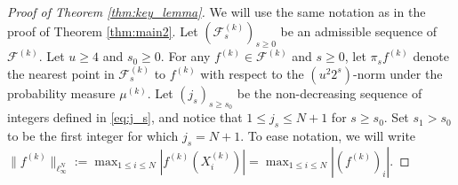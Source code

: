 \documentclass[numbers,webpdf,imaiai]{ima-authoring-template}
\theoremstyle{thmstyletwo}%
\numberwithin{equation}{section}
\numberwithin{equation}{section}
\providecommand{\mathbbm}{\mathbb} %
\newcommand{\R}{\mathbbm{R}}
\newcommand{\F}{\mathcal{F}}
\newcommand{\mcF}{\mathcal{F}}
\begin{document}
\begin{proof}[Proof of Theorem \ref{thm:key_lemma}]
We will use the same notation as in the proof of Theorem \ref{thm:main2}.
Let $(\mcF^{(k)}_s)_{s\ge 0}$ be an admissible sequence of $\mcF^{(k)}.$ Let $u\ge 4$ and $s_0\ge 0$. For any $f^{(k)}\in \F^{(k)}$ and $s\ge 0$, let $\pi_s f^{(k)}$ denote the nearest point in $\F^{(k)}_s$ to $f^{(k)}$ with respect to the $(u^2 2^s)$-norm under the probability measure $\mu^{(k)}$.  Let $(j_{s})_{s\ge s_0}$ be the non-decreasing sequence of integers defined in \eqref{eq:j_s}, and notice that $1\le j_{s}\le N+1$ for $s \ge s_0$.  Set $s_1>s_0$ to be the first integer for which $j_{s}=N+1$. To ease notation, we will write $\|f^{(k)}\|_{\ell^N_{\infty}}:= \max_{1\le i\le N}|f^{(k)}(X_i^{(k)})| = 
\max_{1\le i\le N}|(f^{(k)})_i|.$

 

\end{proof}
\end{document}
